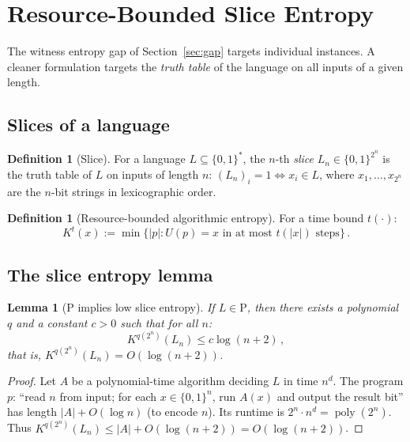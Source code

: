 \documentclass[aps,prd,twocolumn,superscriptaddress,nofootinbib]{revtex4-2}
\newtheorem{lemma}[theorem]{Lemma}
\theoremstyle{definition}
\newtheorem{definition}[theorem]{Definition}
\theoremstyle{remark}
\DeclareMathOperator{\poly}{poly}
\newcommand{\PP}{\mathrm{P}}
\begin{document}
\section{Resource-Bounded Slice Entropy}
\label{sec:slices}

The witness entropy gap of Section~\ref{sec:gap} targets individual instances. A cleaner formulation targets the \textit{truth table} of the language on all inputs of a given length.

\subsection{Slices of a language}

\begin{definition}[Slice]
For a language $L \subseteq \{0,1\}^*$, the $n$-th \textit{slice} $L_n \in \{0,1\}^{2^n}$ is the truth table of $L$ on inputs of length $n$: $(L_n)_i = 1 \iff x_i \in L$, where $x_1, \ldots, x_{2^n}$ are the $n$-bit strings in lexicographic order.
\end{definition}

\begin{definition}[Resource-bounded algorithmic entropy]
For a time bound $t(\cdot)$:
\begin{equation}
K^t(x) := \min\{|p| : U(p) = x \text{ in at most } t(|x|) \text{ steps}\}\,.
\label{eq:Kt}
\end{equation}
\end{definition}

\subsection{The slice entropy lemma}

\begin{lemma}[P implies low slice entropy]
\label{lem:p_low_entropy}
If $L \in \PP$, then there exists a polynomial $q$ and a constant $c > 0$ such that for all $n$:
\begin{equation}
K^{q(2^n)}(L_n) \leq c \log(n+2)\,,
\label{eq:p_entropy}
\end{equation}
that is, $K^{q(2^n)}(L_n) = O(\log(n+2))$.
\end{lemma}

\begin{proof}
Let $A$ be a polynomial-time algorithm deciding $L$ in time $n^d$. The program $p$: ``read $n$ from input; for each $x \in \{0,1\}^n$, run $A(x)$ and output the result bit'' has length $|A| + O(\log n)$ (to encode $n$). Its runtime is $2^n \cdot n^d = \poly(2^n)$. Thus $K^{q(2^n)}(L_n) \leq |A|+O(\log(n+2))=O(\log(n+2))$.
\end{proof}
\end{document}
